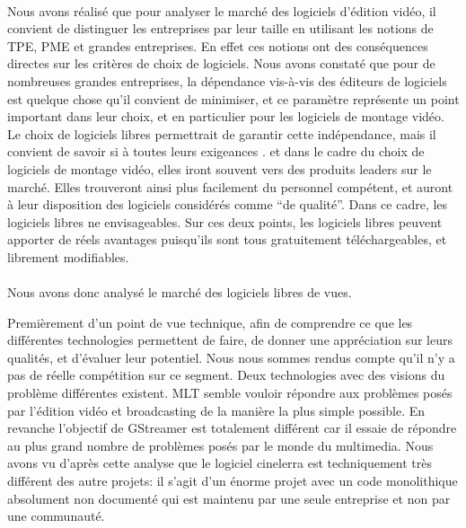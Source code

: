 \paragraph{}

Nous avons réalisé que pour analyser le marché des logiciels
d'édition vidéo, il convient de distinguer les entreprises par leur
taille en utilisant les notions de TPE, PME et grandes entreprises. En
effet ces notions ont des conséquences directes sur les critères
de choix de logiciels.  Nous avons constaté que pour de
nombreuses  grandes entreprises, la dépendance vis-à-vis des éditeurs
de logiciels est quelque chose qu'il convient de minimiser, et ce
paramètre représente un point important dans leur choix,
et en particulier pour les logiciels de montage vidéo. 
Le choix de logiciels libres permettrait de garantir cette indépendance, mais il
convient de savoir si à toutes leurs exigeances . 
%
%
et dans le cadre du choix de logiciels de montage vidéo, elles iront
souvent vers des produits leaders sur le marché. Elles trouveront ainsi
plus facilement du personnel compétent, et auront à leur disposition
des logiciels considérés comme ``de qualité''. Dans ce cadre, les
logiciels libres ne %
envisageables. 
%
%
Sur ces deux points, les logiciels libres peuvent apporter de
réels avantages puisqu'ils sont tous gratuitement téléchargeables,
et librement modifiables.


\paragraph{}

Nous avons donc analysé le marché des logiciels libres %
de vues.

Premièrement d'un point de vue technique, afin de comprendre ce que les
différentes technologies permettent de faire, de donner une appréciation
sur leurs qualités, et d'évaluer leur potentiel. Nous nous sommes rendus
compte qu'il n'y a pas de réelle compétition sur ce segment. Deux
technologies avec des visions du problème différentes existent. MLT
semble vouloir répondre aux problèmes posés par l'édition vidéo
et broadcasting de la manière la plus simple possible. En revanche
l'objectif de GStreamer est totalement différent car il essaie de
répondre au plus grand nombre de problèmes posés par le monde
du multimedia. Nous avons vu d'après cette analyse que le logiciel
cinelerra est techniquement très différent des autre projets: il
s'agit d'un énorme projet avec un code monolithique
absolument non documenté qui est maintenu par une seule entreprise et
non par une communauté.

